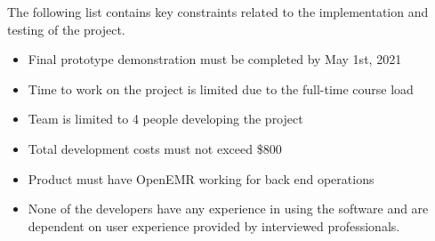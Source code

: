 The following list contains key constraints related to the implementation and testing of the project.

\begin{itemize}
  \item Final prototype demonstration must be completed by May 1st, 2021
  \item Time to work on the project is limited due to the full-time course load
  \item Team is limited to 4 people developing the project
  \item Total development costs must not exceed \$800
  \item Product must have OpenEMR working for back end operations
  			\item None of the developers have any experience in using the software and are dependent on user  								experience provided by interviewed professionals.
\end{itemize}
